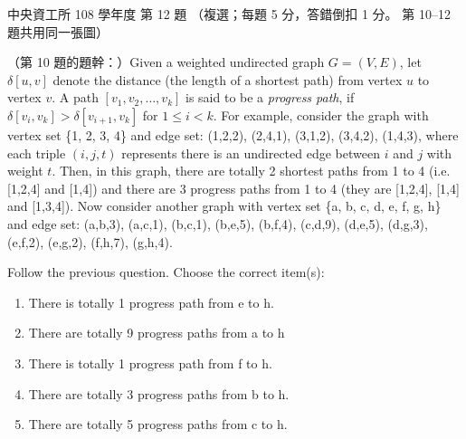 \begin{pastexam}[label={px:ncu-108-dsa-12}]{中央資工所 108 學年度 第 12 題}
（複選；每題 5 分，答錯倒扣 1 分。 第 10--12 題共用同一張圖）

（第 10 題的題幹：）Given a weighted undirected graph $G = (V, E)$, let $\delta[u, v]$ denote the distance (the length
of a shortest path) from vertex $u$ to vertex $v$. A path $[v_1, v_2, \ldots, v_k]$ is said to be a
\textit{progress path}, if $\delta[v_i, v_k] > \delta[v_{i+1}, v_k]$ for $1 \le i < k$. For example,
consider the graph with vertex set \{1, 2, 3, 4\} and edge set: (1,2,2), (2,4,1), (3,1,2), (3,4,2),
(1,4,3), where each triple $(i, j, t)$ represents there is an undirected edge between $i$ and $j$
with weight $t$. Then, in this graph, there are totally 2 shortest paths from 1 to 4 (i.e. [1,2,4]
and [1,4]) and there are 3 progress paths from 1 to 4 (they are [1,2,4], [1,4] and [1,3,4]). Now
consider another graph with vertex set \{a, b, c, d, e, f, g, h\} and edge set: (a,b,3), (a,c,1),
(b,c,1), (b,e,5), (b,f,4), (c,d,9), (d,e,5), (d,g,3), (e,f,2), (e,g,2), (f,h,7), (g,h,4).

Follow the previous question. Choose the correct item(s):
\begin{enumerate}[label=(\Alph*)]
\item There is totally 1 progress path from e to h.
\item There are totally 9 progress paths from a to h
\item There is totally 1 progress path from f to h.
\item There are totally 3 progress paths from b to h.
\item There are totally 5 progress paths from c to h.
\end{enumerate}
\end{pastexam}

